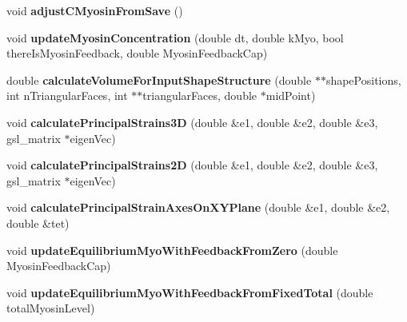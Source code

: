 \begin{DoxyCompactItemize}
\item 
\hypertarget{classShapeBase_ae141d5296b5b4ce7ca59b8c217ef2947}{}void {\bfseries adjust\+C\+Myosin\+From\+Save} ()\label{classShapeBase_ae141d5296b5b4ce7ca59b8c217ef2947}

\item 
\hypertarget{classShapeBase_aa5af6d7dda5ce1f12bf644d06b1f151c}{}void {\bfseries update\+Myosin\+Concentration} (double dt, double k\+Myo, bool there\+Is\+Myosin\+Feedback, double Myosin\+Feedback\+Cap)\label{classShapeBase_aa5af6d7dda5ce1f12bf644d06b1f151c}

\item 
\hypertarget{classShapeBase_ae4e4fe88c885bf0d2448475dd403dadf}{}double {\bfseries calculate\+Volume\+For\+Input\+Shape\+Structure} (double $\ast$$\ast$shape\+Positions, int n\+Triangular\+Faces, int $\ast$$\ast$triangular\+Faces, double $\ast$mid\+Point)\label{classShapeBase_ae4e4fe88c885bf0d2448475dd403dadf}

\item 
\hypertarget{classShapeBase_a3cde54fe712bac297fa73949d07c1bd4}{}void {\bfseries calculate\+Principal\+Strains3\+D} (double \&e1, double \&e2, double \&e3, gsl\+\_\+matrix $\ast$eigen\+Vec)\label{classShapeBase_a3cde54fe712bac297fa73949d07c1bd4}

\item 
\hypertarget{classShapeBase_a6fe833f9684db5cc1847761b6bbd9aa9}{}void {\bfseries calculate\+Principal\+Strains2\+D} (double \&e1, double \&e2, double \&e3, gsl\+\_\+matrix $\ast$eigen\+Vec)\label{classShapeBase_a6fe833f9684db5cc1847761b6bbd9aa9}

\item 
\hypertarget{classShapeBase_a52c8bd76ad2d14cab37563fcdeff1b20}{}void {\bfseries calculate\+Principal\+Strain\+Axes\+On\+X\+Y\+Plane} (double \&e1, double \&e2, double \&tet)\label{classShapeBase_a52c8bd76ad2d14cab37563fcdeff1b20}

\item 
\hypertarget{classShapeBase_a6d50f91e2e243539cfa67b8c0f28612e}{}void {\bfseries update\+Equilibrium\+Myo\+With\+Feedback\+From\+Zero} (double Myosin\+Feedback\+Cap)\label{classShapeBase_a6d50f91e2e243539cfa67b8c0f28612e}

\item 
\hypertarget{classShapeBase_a842a99fa11e8bd7293644ccb0b99ba3a}{}void {\bfseries update\+Equilibrium\+Myo\+With\+Feedback\+From\+Fixed\+Total} (double total\+Myosin\+Level)\label{classShapeBase_a842a99fa11e8bd7293644ccb0b99ba3a}


\end{DoxyCompactItemize}
